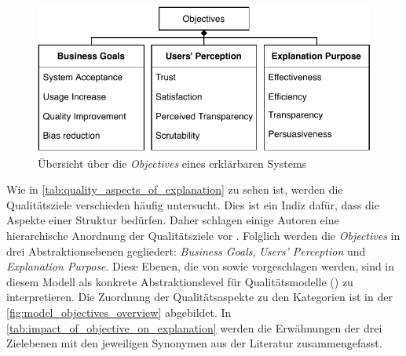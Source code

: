 \begin{figure}[b!]
    \begin{center}
        \includegraphics{contents/05_model_description/res/model_objectives_overview.pdf}
    \end{center}
    \caption{Übersicht über die \textit{Objectives} eines erklärbaren Systems}
    \label{fig:model_objectives_overview}
\end{figure}

Wie in \autoref{tab:quality_aspects_of_explanation} zu sehen ist, werden die Qualitätsziele verschieden häufig untersucht. Dies ist ein Indiz dafür, dass die Aspekte einer Struktur bedürfen. Daher schlagen einige Autoren eine hierarchische Anordnung der Qualitätsziele vor \cite{nunes_systematic_2017,tintarev2007survey,waa_evaluating_2021}. Folglich werden die \textit{Objectives} in drei Abstraktionsebenen gegliedert: \textit{Business Goals}, \textit{Users' Perception} und \textit{Explanation Purpose}. Diese Ebenen, die von \citeauthor{nunes_systematic_2017} sowie \citeauthor{tintarev2007survey} vorgeschlagen werden, sind in diesem Modell als konkrete Abstraktionslevel für Qualitätsmodelle (\cite[vgl.][]{schneider2012abenteuer}) zu interpretieren. Die Zuordnung der Qualitätsaspekte zu den Kategorien ist in der \autoref{fig:model_objectives_overview} abgebildet. In \autoref{tab:impact_of_objective_on_explanation} werden die Erwähnungen der drei Zielebenen mit den jeweiligen Synonymen aus der Literatur zusammengefasst.

